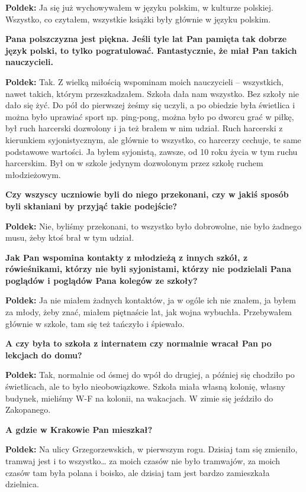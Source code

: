 \begin{otherlanguage}{polish}
\textbf{Poldek:} Ja się już wychowywałem w języku polskim, w kulturze polskiej. Wszystko, co czytałem, wszystkie książki były głównie w języku polskim.
 
\textbf{Pana polszczyzna jest piękna. Jeśli tyle lat Pan pamięta tak dobrze język polski, to tylko pogratulować. Fantastycznie, że miał Pan takich nauczycieli.}

\textbf{Poldek:} Tak. Z wielką miłością wspominam moich nauczycieli – wszystkich, nawet takich, którym przeszkadzałem. Szkoła dała nam wszystko. Bez szkoły nie dało się żyć. Do pół do pierwszej żeśmy się uczyli, a po obiedzie była świetlica i można było uprawiać sport np. ping-pong, można było po dworcu grać w piłkę, był ruch harcerski dozwolony i ja też brałem w nim udział. Ruch harcerski z kierunkiem syjonistycznym, ale głównie to wszystko, co harcerzy cechuje, te same podstawowe wartości. Ja byłem syjonistą, zawsze, od 10 roku życia w tym ruchu harcerskim. Był on w szkole jedynym dozwolonym przez szkołę ruchem młodzieżowym.

\textbf{Czy wszyscy uczniowie byli do niego przekonani, czy w jakiś sposób byli skłaniani by przyjąć takie podejście?}

\textbf{Poldek:} Nie, byliśmy przekonani, to wszystko było dobrowolne, nie było żadnego musu, żeby ktoś brał w tym udział. 
  
\textbf{Jak Pan wspomina kontakty z młodzieżą z innych szkół, z rówieśnikami, którzy nie byli syjonistami, którzy nie podzielali Pana poglądów i poglądów Pana kolegów ze szkoły?}
 
\textbf{Poldek:} Ja nie miałem żadnych kontaktów, ja w ogóle ich nie znałem, ja byłem za młody, żeby znać, miałem piętnaście lat, jak wojna wybuchła. Przebywałem głównie w szkole, tam się też tańczyło i śpiewało.

\textbf{A czy była to szkoła z internatem czy normalnie wracał Pan po lekcjach do domu?}

\textbf{Poldek:} Tak, normalnie od ósmej do wpół do drugiej, a później się chodziło po świetlicach, ale to było nieobowiązkowe. Szkoła miała własną kolonię, własny budynek, mieliśmy W-F na kolonii, na wakacjach. W zimie się jeździło do Zakopanego.

\textbf{A gdzie w Krakowie Pan mieszkał?}

\textbf{Poldek:} Na ulicy Grzegorzewskich, w pierwszym rogu. Dzisiaj tam się zmieniło, tramwaj jest i to wszystko… za moich czasów nie było tramwajów, za moich czasów tam była polana i boisko, ale dzisiaj tam jest bardzo zamieszkała dzielnica.


\end{otherlanguage}
